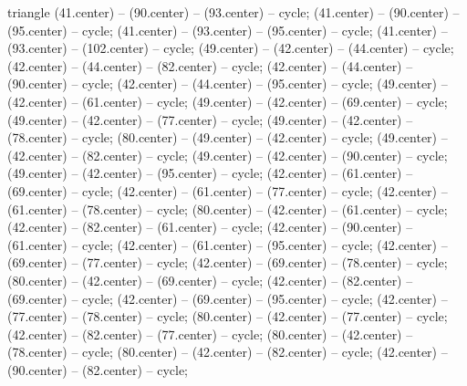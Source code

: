 \begin{pgfonlayer}{triangle}
 (41.center) -- (90.center) -- (93.center) -- cycle; 
 (41.center) -- (90.center) -- (95.center) -- cycle; 
 (41.center) -- (93.center) -- (95.center) -- cycle; 
 (41.center) -- (93.center) -- (102.center) -- cycle; 
 (49.center) -- (42.center) -- (44.center) -- cycle; 
 (42.center) -- (44.center) -- (82.center) -- cycle; 
 (42.center) -- (44.center) -- (90.center) -- cycle; 
 (42.center) -- (44.center) -- (95.center) -- cycle; 
 (49.center) -- (42.center) -- (61.center) -- cycle; 
 (49.center) -- (42.center) -- (69.center) -- cycle; 
 (49.center) -- (42.center) -- (77.center) -- cycle; 
 (49.center) -- (42.center) -- (78.center) -- cycle; 
 (80.center) -- (49.center) -- (42.center) -- cycle; 
 (49.center) -- (42.center) -- (82.center) -- cycle; 
 (49.center) -- (42.center) -- (90.center) -- cycle; 
 (49.center) -- (42.center) -- (95.center) -- cycle; 
 (42.center) -- (61.center) -- (69.center) -- cycle; 
 (42.center) -- (61.center) -- (77.center) -- cycle; 
 (42.center) -- (61.center) -- (78.center) -- cycle; 
 (80.center) -- (42.center) -- (61.center) -- cycle; 
 (42.center) -- (82.center) -- (61.center) -- cycle; 
 (42.center) -- (90.center) -- (61.center) -- cycle; 
 (42.center) -- (61.center) -- (95.center) -- cycle; 
 (42.center) -- (69.center) -- (77.center) -- cycle; 
 (42.center) -- (69.center) -- (78.center) -- cycle; 
 (80.center) -- (42.center) -- (69.center) -- cycle; 
 (42.center) -- (82.center) -- (69.center) -- cycle; 
 (42.center) -- (69.center) -- (95.center) -- cycle; 
 (42.center) -- (77.center) -- (78.center) -- cycle; 
 (80.center) -- (42.center) -- (77.center) -- cycle; 
 (42.center) -- (82.center) -- (77.center) -- cycle; 
 (80.center) -- (42.center) -- (78.center) -- cycle; 
 (80.center) -- (42.center) -- (82.center) -- cycle; 
 (42.center) -- (90.center) -- (82.center) -- cycle; 

\end{pgfonlayer}
